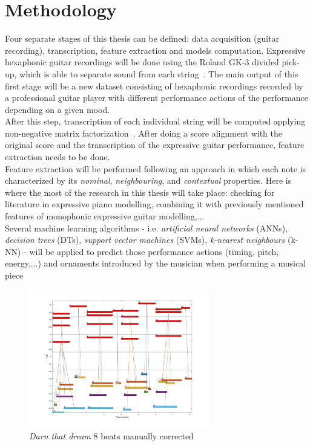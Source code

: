 \chapter{Methodology}
\label{chap:methods}
Four separate stages of this thesis can be defined: data acquisition (guitar recording), transcription, feature extraction and models computation. Expressive hexaphonic guitar recordings will be done using the Roland GK-3 divided pick-up, which is able to separate sound from each string~\cite{Angulo2016}. The main output of this first stage will be a new dataset consisting of hexaphonic recordings recorded by a professional guitar player with different performance actions of the performance depending on a given mood. \\
After this step, transcription of each individual string will be computed applying non-negative matrix factorization~\cite{OGrady2009}. After doing a score alignment with the original score and the transcription of the expressive guitar performance, feature extraction needs to be done.\\
Feature extraction will be performed following an approach in which each note is characterized by its \textit{nominal}, \textit{neighbouring}, and \textit{contextual} properties.  Here is where the most of the research in this thesis will take place:  checking for literature in expressive piano modelling, combining it with previously mentioned features of monophonic expressive guitar modelling,... \\
Several machine learning algorithms - i.e. \textit{artificial neural networks} (ANNs), \textit{decision trees} (DTs), \textit{support vector machines} (SVMs), \textit{k-nearest neighbours} (k-NN) - will be applied to predict those performance actions (timing, pitch, energy,...) and ornaments introduced by the musician when performing a musical piece

\begin{figure}
  \caption{\textit{Darn that dream} 8 beats manually corrected}
  \centering
    \includegraphics[width=0.7\textwidth]{Figures/Darn_8b_corrected.pdf}
\end{figure}

